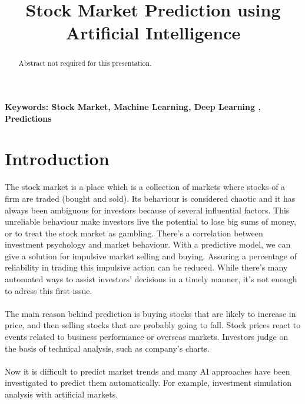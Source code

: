 \documentclass[conference]{IEEEtran}
\begin{document}
\title{Stock Market Prediction using \\Artificial Intelligence}
\author{
}
\maketitle
\begin{abstract}
Abstract not required for this presentation.
\end{abstract}
\textbf{Keywords: Stock  Market,  Machine  Learning, Deep Learning , Predictions}
\IEEEpeerreviewmaketitle
\section{Introduction}
The stock market is a place which is a collection of markets where stocks of a firm are traded (bought and sold)\cite{M2018}.
Its behaviour is considered chaotic \cite{Singh2016} and it has always been ambiguous for investors
because of several influential factors. This unreliable behaviour make investors live the potential to lose big sums of money, or to treat
the stock market as gambling. There's a correlation between investment psychology and market behaviour. With a predictive model, we can give a 
solution for impulsive market selling and buying. Assuring a percentage of reliability in trading this impulsive action can be reduced. While there's many automated ways to assist investors' decisions
in a timely manner\cite{nabipour2020predicting}, it's not enough to adress this first issue.
\\\\
The main reason behind prediction is buying stocks that are likely to increase in price, and then selling stocks that are probably going to fall\cite{nabipour2020predicting}. 
Stock prices react to events related to business performance or overseas markets. Investors judge on the basis of technical analysis, such as company's charts\cite{Akita2016}.
\\\\
Now it is difficult to predict market trends and many AI approaches
have been investigated to predict them automatically. For example, investment simulation analysis with artificial
 markets\cite{Akita2016}.
\\\\
\end{document}

